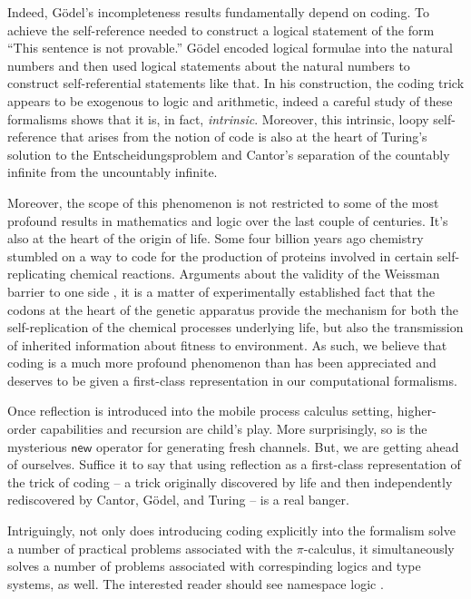 Indeed, G\"odel's incompleteness results fundamentally depend on
coding. To achieve the self-reference needed to construct a logical
statement of the form ``This sentence is not provable.'' G\"odel
encoded logical formulae into the natural numbers and then used
logical statements about the natural numbers to construct
self-referential statements like that. In his construction, the coding
trick appears to be exogenous to logic and arithmetic, indeed a
careful study of these formalisms shows that it is, in fact,
\emph{intrinsic}. Moreover, this intrinsic, loopy self-reference that
arises from the notion of code is also at the heart of Turing's
solution to the Entscheidungsproblem and Cantor's separation of the
countably infinite from the uncountably infinite.

Moreover, the scope of this phenomenon is not restricted to some of
the most profound results in mathematics and logic over the last
couple of centuries. It's also at the heart of the origin of
life. Some four billion years ago chemistry stumbled on a way to code
for the production of proteins involved in certain self-replicating
chemical reactions. Arguments about the validity of the Weissman
barrier to one side \cite{William2018TheGA}, it is a matter of
experimentally established fact that the codons at the heart of the
genetic apparatus provide the mechanism for both the self-replication
of the chemical processes underlying life, but also the transmission
of inherited information about fitness to environment. As such, we
believe that coding is a much more profound phenomenon than has been
appreciated and deserves to be given a first-class representation in
our computational formalisms.

Once reflection is introduced into the mobile process calculus
setting, higher-order capabilities and recursion are child's
play. More surprisingly, so is the mysterious $\mathsf{new}$ operator
for generating fresh channels. But, we are getting ahead of
ourselves. Suffice it to say that using reflection as a first-class
representation of the trick of coding -- a trick originally discovered
by life and then independently rediscovered by Cantor, G\"odel, and
Turing -- is a real banger.

Intriguingly, not only does introducing coding explicitly into the
formalism solve a number of practical problems associated with the
$\pi$-calculus, it simultaneously solves a number of problems
associated with correspinding logics and type systems, as well. The
interested reader should see namespace logic
\cite{DBLP:conf/tgc/MeredithR05}.

